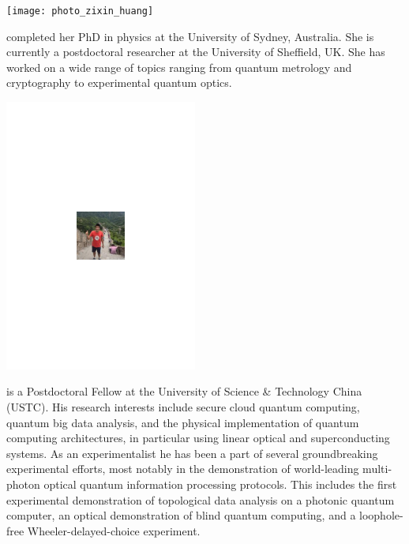 %
%

\begin{center}
\texttt{[image: photo\_zixin\_huang]}
\end{center}

 completed her PhD in physics at the University of Sydney, Australia. She is currently a postdoctoral researcher at the University of Sheffield, UK. She has worked on a wide range of topics ranging from quantum metrology and cryptography to experimental quantum optics. 


%
%

\begin{center}
\includegraphics[clip=true, width=0.475\textwidth]{photo_heliang_huang}
\end{center}

 is a Postdoctoral Fellow at the University of Science \& Technology China (USTC). His research interests include secure cloud quantum computing, quantum big data analysis, and the physical implementation of quantum computing architectures, in particular using linear optical and superconducting systems. As an experimentalist he has been a part of several groundbreaking experimental efforts, most notably in the demonstration of world-leading multi-photon optical quantum information processing protocols. This includes the first experimental demonstration of topological data analysis on a photonic quantum computer, an optical demonstration of blind quantum computing, and a loophole-free Wheeler-delayed-choice experiment.

%
%

